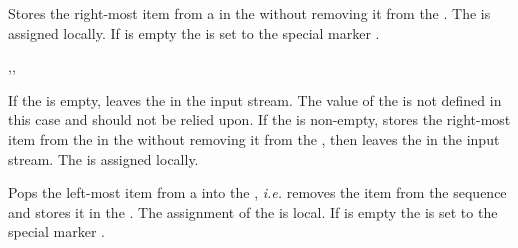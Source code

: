\documentclass[oneside]{book}
\begin{document}
\begin{function}{\SeqGetRight}
\begin{syntax}
  
\end{syntax}
Stores the right-most item from a  in the
 without removing it from the
. The  is assigned locally.
If  is empty the 
is set to the special marker .
\begin{demohigh}
\SeqSetFromClist {}
\SeqGetRight \lTmpaSeq \lTmpaTl
\TlUse \lTmpaTl
\end{demohigh}
\end{function}

\begin{function}{\SeqGetRightT,\SeqGetRightF,\SeqGetRightTF}
\begin{syntax}
   
   
    
\end{syntax}
If the  is empty, leaves the  in the
input stream.  The value of the  is
not defined in this case and should not be relied upon.  If the
 is non-empty, stores the right-most item from the
in the  without removing it from the
, then leaves the  in the input stream.
The  is assigned locally.
\begin{demohigh}
\SeqSetFromClist {}
\SeqGetRightTF \lTmpaSeq {} {}
\end{demohigh}
\end{function}

\begin{function}{\SeqPopLeft}
\begin{syntax}
  
\end{syntax}
Pops the left-most item from a  into the
, \emph{i.e.} removes the item from the
sequence and stores it in the .
The assignment of the  is local.
If  is empty the 
is set to the special marker .
\begin{demohigh}
\SeqSetFromClist {}
\SeqPopLeft \lTmpaSeq \lTmpaTl
\SeqVarJoin \lTmpaSeq {,}
\end{demohigh}
\end{function}
\end{document}
